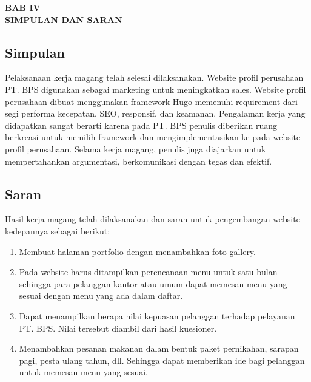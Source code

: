 \begin{center}
    \textbf{BAB IV \\ SIMPULAN DAN SARAN}
\end{center}
\setcounter{section}{4}
\setcounter{subsection}{0}

\subsection{Simpulan}

Pelaksanaan kerja magang telah selesai dilaksanakan. Website profil perusahaan 
PT. BPS digunakan sebagai marketing untuk meningkatkan sales. Website profil 
perusahaan dibuat menggunakan framework Hugo memenuhi requirement dari segi performa kecepatan, 
SEO, responsif, dan keamanan. Pengalaman kerja yang didapatkan sangat berarti karena pada 
PT. BPS penulis diberikan ruang berkreasi untuk memilih 
framework dan mengimplementasikan ke pada website profil perusahaan. Selama kerja magang, 
penulis juga diajarkan untuk mempertahankan argumentasi, berkomunikasi dengan tegas dan efektif.

\subsection{Saran}
Hasil kerja magang telah dilaksanakan dan saran untuk pengembangan website kedepannya sebagai berikut:
\begin{enumerate}[label=(\alph*)]
\item Membuat halaman portfolio dengan menambahkan foto gallery.
\item Pada website harus ditampilkan perencanaan menu untuk satu bulan sehingga para 
pelanggan kantor atau umum dapat memesan menu yang sesuai dengan menu yang ada dalam daftar.
\item Dapat menampilkan berapa nilai kepuasan pelanggan terhadap pelayanan PT. BPS. 
Nilai tersebut diambil dari hasil kuesioner.
\item Menambahkan pesanan makanan dalam bentuk paket pernikahan, sarapan pagi, 
pesta ulang tahun, dll. Sehingga dapat memberikan ide bagi pelanggan untuk memesan menu yang sesuai.
\end{enumerate}